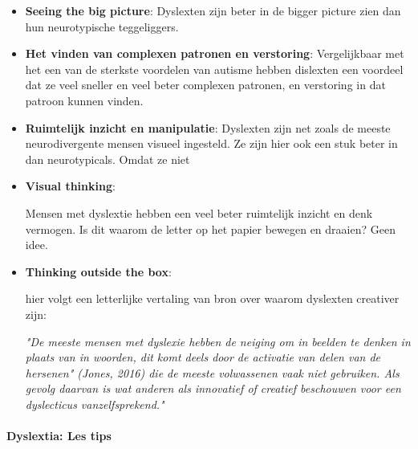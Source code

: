 \documentclass{article}
\begin{document}
                    \begin{itemize}
                        \item \textbf{Seeing the big picture}\cite{dyslextia-struggles-and-superpowers}:
                            Dyslexten zijn beter in de bigger picture zien dan hun neurotypische teggeliggers.
                        \item \textbf{Het vinden van complexen patronen en verstoring}\cite{dyslextia-struggles-and-superpowers}:
                            Vergelijkbaar met het een van de sterkste voordelen van autisme hebben dislexten een voordeel dat ze veel sneller en veel beter complexen patronen, en verstoring in dat patroon kunnen vinden.
                        \item \textbf{Ruimtelijk inzicht en manipulatie}\cite{dyslextia-struggles-and-superpowers}:
                            Dyslexten zijn net zoals de meeste neurodivergente mensen visueel ingesteld. Ze zijn hier ook een stuk beter in dan neurotypicals. Omdat ze niet 
                        
                        \item \textbf{Visual thinking}\cite{dyslextia-struggles-and-superpowers}:
                            
                            Mensen met dyslextie hebben een veel beter ruimtelijk inzicht en denk vermogen. Is dit waarom de letter op het papier bewegen en draaien? Geen idee.
                        
                        \item \textbf{Thinking outside the box}\cite{dyslextia-struggles-and-superpowers}:
                            
                            hier volgt een letterlijke vertaling van bron \cite{Creativity-and-Dyslexia} over waarom dyslexten creativer zijn:
                            
                            \textit{"De meeste mensen met dyslexie hebben de neiging om in beelden te denken in plaats van in woorden, dit komt deels door de activatie van delen van de hersenen" (Jones, 2016) die de meeste volwassenen vaak niet gebruiken. Als gevolg daarvan is wat anderen als innovatief of creatief beschouwen voor een dyslecticus vanzelfsprekend."}

                    \end{itemize}
                
                \bigskip\noindent\paragraph{Dyslextia: Les tips}
                    
\end{document}

